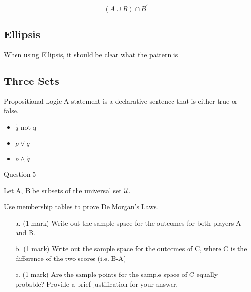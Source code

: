 \[ (A \cup B) \cap B^{\prime} \]


\subsection{Ellipsis}

When using Ellipsis, it should be clear what the pattern is



\subsection*{ Three Sets }


Propositional Logic A statement is a declarative sentence that
is either true or false.
\begin{itemize}
\item $\tilde q$ not q \item $p \vee q$ \item $p \wedge \tilde
q$
\end{itemize}




Question 5


Let A, B be subsets of the universal set $\mathcal{U}$.

Use membership tables to prove De Morgan's Laws.


%
%
%


\begin{itemize}
\item[a.] (1 mark) Write out the sample space for the outcomes for both players A and B.
\item[b.] (1 mark) Write out the sample space for the outcomes of C, where C is the difference of the two scores (i.e. B-A)
\item[c.] (1 mark) Are the sample points for the sample space of C equally probable? Provide a brief justification for your answer.
\end{itemize}

\newpage

